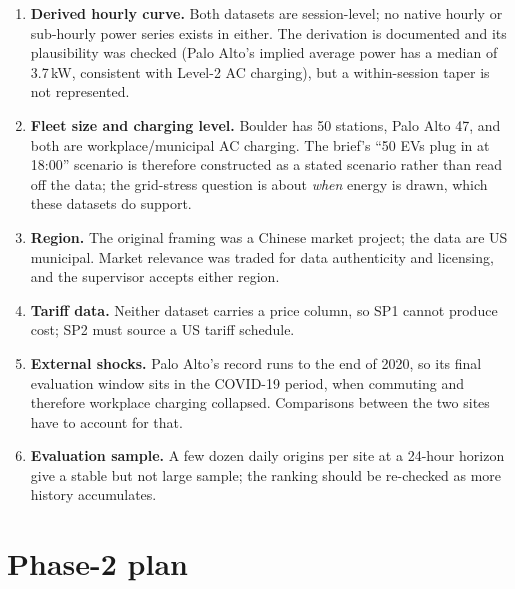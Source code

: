 \documentclass[11pt,a4paper]{article}
\begin{document}
\begin{enumerate}
  \item \textbf{Derived hourly curve.} Both datasets are session-level; no native hourly or
        sub-hourly power series exists in either. The derivation is documented and its
        plausibility was checked (Palo Alto's implied average power has a median of 3.7\,kW,
        consistent with Level-2 AC charging), but a within-session taper is not represented.
  \item \textbf{Fleet size and charging level.} Boulder has 50 stations, Palo Alto 47, and both
        are workplace/municipal AC charging. The brief's ``50 EVs plug in at 18:00'' scenario is
        therefore constructed as a stated scenario rather than read off the data; the grid-stress
        question is about \emph{when} energy is drawn, which these datasets do support.
  \item \textbf{Region.} The original framing was a Chinese market project; the data are US
        municipal. Market relevance was traded for data authenticity and licensing, and the
        supervisor accepts either region.
  \item \textbf{Tariff data.} Neither dataset carries a price column, so SP1 cannot produce cost;
        SP2 must source a US tariff schedule.
  \item \textbf{External shocks.} Palo Alto's record runs to the end of 2020, so its final
        evaluation window sits in the COVID-19 period, when commuting and therefore workplace
        charging collapsed. Comparisons between the two sites have to account for that.
  \item \textbf{Evaluation sample.} A few dozen daily origins per site at a 24-hour horizon give a
        stable but not large sample; the ranking should be re-checked as more history
        accumulates.
\end{enumerate}

\section{Phase-2 plan}\label{sec:next}
\end{document}
